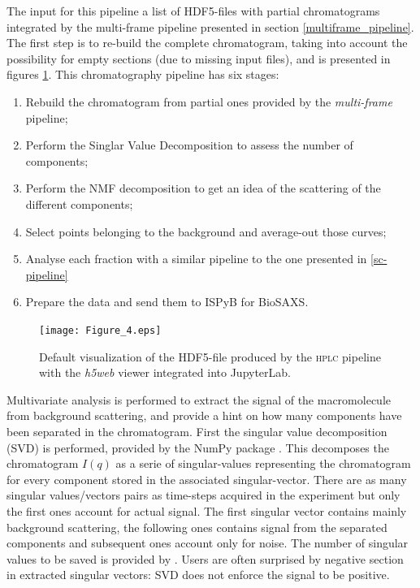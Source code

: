 \documentclass[preprint]{iucr}              %
\begin{document}
The input for this pipeline a list of HDF5-files with partial chromatograms integrated by the multi-frame pipeline presented in section \ref{multiframe_pipeline}.
The first step is to re-build the complete chromatogram, taking into account the possibility for empty sections (due to missing input files), and is presented in figures \ref{hplc}.
This chromatography pipeline has six stages:
\begin{enumerate}
    \item Rebuild the chromatogram from partial ones provided by the \textit{multi-frame} pipeline;
    \item Perform the Singlar Value Decomposition to assess the number of components;
    \item Perform the NMF decomposition to get an idea of the scattering of the different components;
    \item Select points belonging to the background and average-out those curves;
    \item Analyse each fraction with a similar pipeline to the one presented in \ref{sc-pipeline}
    \item Prepare the data and send them to ISPyB for BioSAXS.
\end{enumerate}

\begin{figure}
\label{hplc}
\begin{center}
\texttt{[image: Figure\_4.eps]}
\caption{Default visualization of the HDF5-file produced by the \textsc{hplc} pipeline with the \textit{h5web} viewer integrated into JupyterLab.}
\end{center}
\end{figure}

Multivariate analysis is performed to extract the signal of the macromolecule from background scattering, and provide a hint on how many components have been separated in the chromatogram. 
First the singular value decomposition (SVD) is performed, provided by the NumPy package \cite{numpy}.
This decomposes the chromatogram $I(q)$ as a serie of singular-values representing the chromatogram for every component stored in the associated singular-vector. 
There are as many singular values/vectors pairs as time-steps acquired in the experiment but only the first ones account for actual signal.
The first singular vector contains mainly background scattering, the following ones contains signal from the separated components and subsequent ones account only for noise. 
The number of singular values to be saved is provided by .
Users are often surprised by negative section in extracted singular vectors: SVD does not enforce the signal to be positive.
\end{document}
